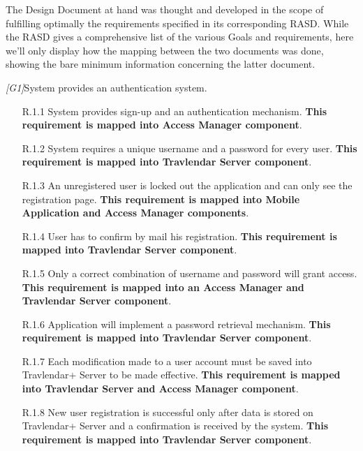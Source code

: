 The Design Document at hand was thought and developed in the scope of fulfilling optimally the requirements specified in its corresponding RASD. While the RASD gives a comprehensive list of the various Goals and requirements, here we'll only display how the mapping between the two documents was done, showing the bare minimum information concerning the latter document.

\begin{description}
	\item \textit{[G1]}System provides an authentication system.
		\begin{itemize}
			\item [R.1.1] System provides sign-up and an authentication mechanism.
			\textbf{This requirement is mapped into Access Manager component}.
			
			\item [R.1.2] System requires a unique username and a password for every user.			
			\textbf{This requirement is mapped into Travlendar Server component}.
			
			\item [R.1.3] An unregistered user is locked out the application and can only see the registration page.			
			\textbf{This requirement is mapped into Mobile Application and Access Manager components}.

			\item [R.1.4] User has to confirm by mail his registration.			
			\textbf{This requirement is mapped into Travlendar Server component}.
			
			\item [R.1.5] Only a correct combination of username and password will grant access.			
			\textbf{This requirement is mapped into an Access Manager and Travlendar Server component}.

		     \item [R.1.6] Application will implement a password retrieval mechanism.
		     \textbf{This requirement is mapped into Travlendar Server component}.

			\item [R.1.7] Each modification made to a user account must be saved into Travlendar+ Server to be made effective.
			\textbf{This requirement is mapped into Travlendar Server and Access Manager component}.

			\item [R.1.8] New user registration is successful only after data is stored on Travlendar+ Server and a confirmation is received by the system.
			\textbf{This requirement is mapped into Travlendar Server component}.
		\end{itemize}



\end{description}
